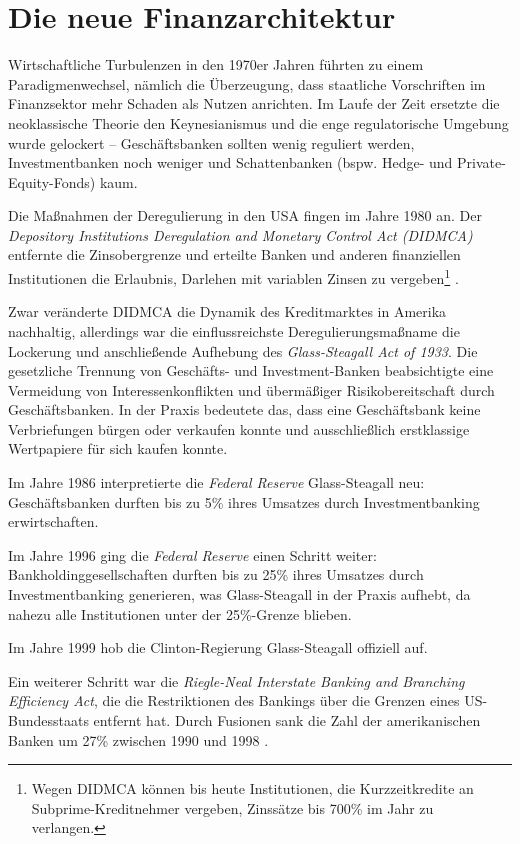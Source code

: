 \documentclass[a4paper,11pt]{report}
\begin{document}
\section{Die neue Finanzarchitektur}
Wirtschaftliche Turbulenzen in den 1970er Jahren f\"uhrten
zu einem Paradigmenwechsel, n\"amlich die \"Uberzeugung, dass staatliche
Vorschriften im Finanzsektor mehr Schaden als Nutzen anrichten.
Im Laufe der Zeit ersetzte die neoklassische Theorie den 
Keynesianismus und die enge regulatorische Umgebung wurde gelockert
-- Geschäftsbanken sollten wenig reguliert werden, Investmentbanken
noch weniger und Schattenbanken (bspw. Hedge- und Private-Equity-Fonds) kaum.

Die Maßnahmen der Deregulierung in den USA fingen im Jahre 1980 an. Der
\textit{Depository Institutions Deregulation and Monetary Control Act (DIDMCA)}
entfernte die Zinsobergrenze und erteilte Banken und anderen
finanziellen Institutionen die Erlaubnis, Darlehen mit variablen
 Zinsen zu vergeben\footnote{Wegen DIDMCA k\"onnen bis heute
 Institutionen, die Kurzzeitkredite an Subprime-Kreditnehmer
 vergeben, Zinss\"atze bis 700\% im Jahr zu verlangen.}
\parencite[6--8]{sherman2009short}.

Zwar ver\"anderte DIDMCA die Dynamik des Kreditmarktes in Amerika
nachhaltig, allerdings war die einflussreichste Deregulierungsmaßname
die Lockerung und anschließende Aufhebung des
\textit{Glass-Steagall Act of 1933}.
Die gesetzliche Trennung von Geschäfts- und Investment-Banken
beabsichtigte eine Vermeidung von Interessenkonflikten und 
\"uberm\"aßiger Risikobereitschaft durch Geschäftsbanken.
In der Praxis bedeutete das, dass eine Gesch\"aftsbank keine 
Verbriefungen b\"urgen oder verkaufen konnte und ausschließlich
erstklassige Wertpapiere f\"ur sich kaufen konnte.

Im Jahre 1986 interpretierte die \textit{Federal Reserve} Glass-Steagall neu:
Geschäftsbanken durften bis zu 5\% ihres Umsatzes durch Investmentbanking
erwirtschaften.

Im Jahre 1996 ging die \textit{Federal Reserve} einen Schritt weiter:
Bankholdinggesellschaften durften bis zu 25\% ihres Umsatzes durch
Investmentbanking generieren, was Glass-Steagall in der Praxis aufhebt,
da nahezu alle Institutionen unter der 25\%-Grenze blieben.

Im Jahre 1999 hob die Clinton-Regierung Glass-Steagall offiziell auf.

Ein weiterer Schritt war die \textit{
  Riegle-Neal  Interstate  Banking  and  Branching Efficiency Act}, die
die Restriktionen des Bankings \"uber die Grenzen eines US-Bundesstaats
entfernt hat. Durch Fusionen sank die Zahl der amerikanischen 
Banken um 27\% zwischen 1990 und 1998 \parencite[8--12]{sherman2009short}.
\end{document}
